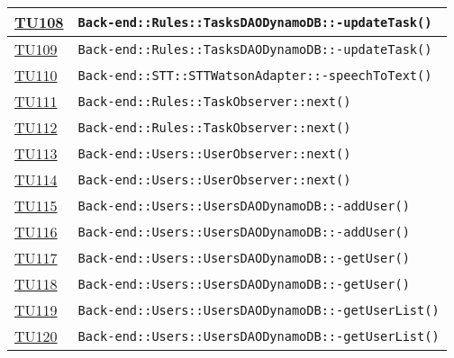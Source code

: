\begin{longtable}{|>{\centering}m{1cm}|m{12cm}<{\centering}|}
\hyperlink{TU108}{TU108} & \texttt{Back-end::Rules::TasksDAODynamoDB::-\linebreak updateTask()}\\ \hline

\hyperlink{TU109}{TU109} & \texttt{Back-end::Rules::TasksDAODynamoDB::-\linebreak updateTask()}\\ \hline

\hyperlink{TU110}{TU110} & \texttt{Back-end::STT::STTWatsonAdapter::-\linebreak speechToText()}\\ \hline

\hyperlink{TU111}{TU111} & \texttt{Back-end::Rules::TaskObserver::next()}\\ \hline

\hyperlink{TU112}{TU112} & \texttt{Back-end::Rules::TaskObserver::next()}\\ \hline

\hyperlink{TU113}{TU113} & \texttt{Back-end::Users::UserObserver::next()}\\ \hline

\hyperlink{TU114}{TU114} & \texttt{Back-end::Users::UserObserver::next()}\\ \hline

\hyperlink{TU115}{TU115} & \texttt{Back-end::Users::UsersDAODynamoDB::-\linebreak addUser()}\\ \hline

\hyperlink{TU116}{TU116} & \texttt{Back-end::Users::UsersDAODynamoDB::-\linebreak addUser()}\\ \hline

\hyperlink{TU117}{TU117} & \texttt{Back-end::Users::UsersDAODynamoDB::-\linebreak getUser()}\\ \hline

\hyperlink{TU118}{TU118} & \texttt{Back-end::Users::UsersDAODynamoDB::-\linebreak getUser()}\\ \hline

\hyperlink{TU119}{TU119} & \texttt{Back-end::Users::UsersDAODynamoDB::-\linebreak getUserList()}\\ \hline

\hyperlink{TU120}{TU120} & \texttt{Back-end::Users::UsersDAODynamoDB::-\linebreak getUserList()}\\ \hline


\end{longtable}
